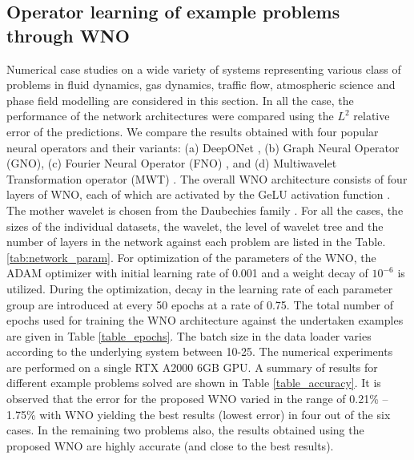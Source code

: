 \documentclass{article}
\begin{document}
\subsection*{Operator learning of example problems through WNO}\label{sec:numerical}
Numerical case studies on a wide variety of systems representing various class of problems in fluid dynamics, gas dynamics, traffic flow, atmospheric science and phase field modelling are considered in this section. In all the case, the performance of the network architectures were compared using the $L^2$ relative error of the predictions. We compare the results obtained with four popular neural operators and their variants: (a) DeepONet \cite{lu2022comprehensive,lu2019deeponet}, (b) Graph Neural Operator (GNO), (c) Fourier Neural Operator (FNO) \cite{li2020fourier}, and (d) Multiwavelet Transformation operator (MWT) \cite{gupta2021multiwavelet}.
The overall WNO architecture consists of four layers of WNO, each of which are activated by the GeLU activation function \cite{hendrycks2016gaussian}. 
The mother wavelet is chosen from the Daubechies family \cite{daubechies1992ten,meyer1993wavelets}. For all the cases, the sizes of the individual datasets, the wavelet, the level of wavelet tree and the number of layers in the network against each problem are listed in the Table. \ref{tab:network_param}. For optimization of the parameters of the WNO, the ADAM optimizer with initial learning rate of 0.001 and a weight decay of $10^{-6}$ is utilized. During the optimization, decay in the learning rate of each parameter group are introduced at every 50 epochs at a rate of 0.75. The total number of epochs used for training the WNO architecture against the undertaken examples are given in Table \ref{table_epochs}. The batch size in the data loader varies according to the underlying system between 10-25. The numerical experiments are performed on a single RTX A2000 6GB GPU. A summary of results for different example problems solved are shown in Table \ref{table_accuracy}. It is observed that the error for the proposed WNO varied in the range of 0.21\% -- 1.75\% with WNO yielding the best results (lowest error) in four out of the six cases. In the remaining two problems also, the results obtained using the proposed WNO are highly accurate (and close to the best results).

\end{document}
